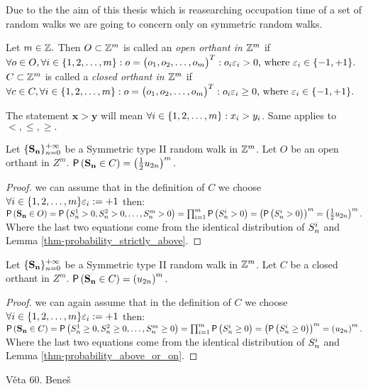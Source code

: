 \begin{rem}
  Due to the the aim of this thesis which is reasearching occupation time of a set of random walks we are going to concern only on symmetric random walks.
\end{rem}
\begin{defn}[Orthant]
  Let $m \in \mathbb{Z}.$ Then $O\subset \mathbb{Z}^m$ is called an \emph{open orthant in $\mathbb{Z}^m$} if $\forall o \in O, \forall i \in \{1,2,\ldots, m\}:o=\begin{pmatrix}
  o_1, o_2, \ldots, o_m
  \end{pmatrix}^T:o_i\varepsilon_i>0 \text{, where } \varepsilon_i\in \{-1,+1\}.$
  $C\subset \mathbb{Z}^m$ is called a \emph{closed orthant in $\mathbb{Z}^m$} if $\forall c \in C, \forall i \in \{1,2,\ldots, m\}:o=\begin{pmatrix}
  o_1, o_2, \ldots, o_m
  \end{pmatrix}^T:o_i\varepsilon_i\geq0 \text{, where } \varepsilon_i\in \{-1,+1\}.$
\end{defn}
\begin{rem}
  The statement $\mathbf{x}>\mathbf{y}$ will mean $\forall i \in \{1,2,\ldots, m\}:x_i>y_i$. Same applies to $<,\leq, \geq.$
\end{rem}
\begin{thm}\label{thm-prob_being_open_orthant}
  Let $\{\mathbf{\mathbf{S_n}}\}_{n=0}^{+\infty}$ be a Symmetric type II random walk in $\mathbb{Z}^m$. Let $O$ be an open orthant in $Z^m$. $\operatorname{\textsf{P}} \left(\mathbf{S_n}\in C\right)=\left( \frac{1}{2} u_{2n}\right)^m.$
\end{thm}
\begin{proof}
  \Wlog we can assume that in the definition of $C$ we choose $\forall i \in \{1,2,\ldots, m\} \varepsilon_i := +1$ then:
  $\pr \left(\mathbf{S_n}\in O\right)
  =\pr \left(\s[1]>0, \s[2]>0, \ldots, \s[m]>0\right)
  =\prod_{i=1}^m \pr \left(\s[i]>0\right)
  =\left(\pr \left( \s>0\right)\right)^m
  =\left(\h u_{2n}\right)^m.$
  Where the last two equations come from the identical distribution of $\s$ and Lemma \ref{thm-probability_strictly_above}.
\end{proof}
\begin{thm}\label{thm-prob_being_closed_orthant}
  Let $\{\mathbf{\mathbf{S_n}}\}_{n=0}^{+\infty}$ be a Symmetric type II random walk in $\mathbb{Z}^m$. Let $C$ be a closed orthant in $Z^m$. $\operatorname{\textsf{P}} \left(\mathbf{S_n}\in C\right)=\left(u_{2n}\right)^m.$
\end{thm}
\begin{proof}
  \Wlog we can again assume that in the definition of $C$ we choose $\forall i \in \{1,2,\ldots, m\} \varepsilon_i := +1$ then:
  $\pr \left(\mathbf{S_n}\in C\right)
  =\pr \left(\s[1]\geq0, \s[2]\geq0, \ldots, \s[m]\geq0\right)
  =\prod_{i=1}^m \pr \left(\s[i]\geq 0\right)
  =\left(\pr \left( \s\geq0\right)\right)^m
  =\left(u_{2n}\right)^m.$
  Where the last two equations come from the identical distribution of $\s$ and Lemma \ref{thm-probability_above_or_on}.
\end{proof}













\begin{thm}
  Věta 60. Beneš
\end{thm}
